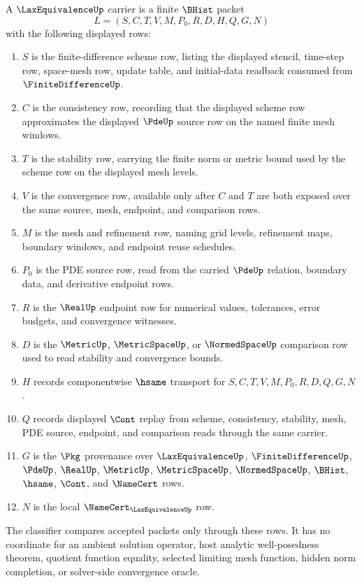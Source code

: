 \begin{definition}
\label{def:lax-equivalence-carrier}
A $\LaxEquivalenceUp$ carrier is a finite $\BHist$ packet
$$
L=(S,C,T,V,M,P_0,R,D,H,Q,G,N)
$$
with the following displayed rows:
\begin{enumerate}
\item $S$ is the finite-difference scheme row, listing the displayed stencil, time-step row, space-mesh row, update table, and initial-data readback consumed from $\FiniteDifferenceUp$.
\item $C$ is the consistency row, recording that the displayed scheme row approximates the displayed $\PdeUp$ source row on the named finite mesh windows.
\item $T$ is the stability row, carrying the finite norm or metric bound used by the scheme row on the displayed mesh levels.
\item $V$ is the convergence row, available only after $C$ and $T$ are both exposed over the same source, mesh, endpoint, and comparison rows.
\item $M$ is the mesh and refinement row, naming grid levels, refinement maps, boundary windows, and endpoint reuse schedules.
\item $P_0$ is the PDE source row, read from the carried $\PdeUp$ relation, boundary data, and derivative endpoint rows.
\item $R$ is the $\RealUp$ endpoint row for numerical values, tolerances, error budgets, and convergence witnesses.
\item $D$ is the $\MetricUp$, $\MetricSpaceUp$, or $\NormedSpaceUp$ comparison row used to read stability and convergence bounds.
\item $H$ records componentwise $\hsame$ transport for $S,C,T,V,M,P_0,R,D,Q,G,N$.
\item $Q$ records displayed $\Cont$ replay from scheme, consistency, stability, mesh, PDE source, endpoint, and comparison reads through the same carrier.
\item $G$ is the $\Pkg$ provenance over $\LaxEquivalenceUp$, $\FiniteDifferenceUp$, $\PdeUp$, $\RealUp$, $\MetricUp$, $\MetricSpaceUp$, $\NormedSpaceUp$, $\BHist$, $\hsame$, $\Cont$, and $\NameCert$ rows.
\item $N$ is the local $\NameCert_{\LaxEquivalenceUp}$ row.
\end{enumerate}
The classifier compares accepted packets only through these rows. It has no coordinate for an ambient solution operator, host analytic well-posedness theorem, quotient function equality, selected limiting mesh function, hidden norm completion, or solver-side convergence oracle.
\end{definition}

